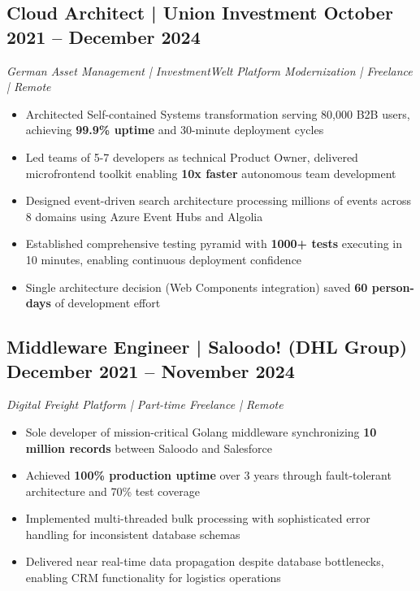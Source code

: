 \documentclass[10pt,a4paper]{article}
\begin{document}
\subsection*{Cloud Architect | Union Investment \hfill October 2021 -- December 2024}
\textit{German Asset Management | InvestmentWelt Platform Modernization | Freelance | Remote}
\begin{itemize}
\item Architected Self-contained Systems transformation serving 80,000 B2B users, achieving \textbf{99.9\% uptime} and 30-minute deployment cycles
\item Led teams of 5-7 developers as technical Product Owner, delivered microfrontend toolkit enabling \textbf{10x faster} autonomous team development
\item Designed event-driven search architecture processing millions of events across 8 domains using Azure Event Hubs and Algolia
\item Established comprehensive testing pyramid with \textbf{1000+ tests} executing in 10 minutes, enabling continuous deployment confidence
\item Single architecture decision (Web Components integration) saved \textbf{60 person-days} of development effort
\end{itemize}

\subsection*{Middleware Engineer | Saloodo! (DHL Group) \hfill December 2021 -- November 2024}
\textit{Digital Freight Platform | Part-time Freelance | Remote}
\begin{itemize}
\item Sole developer of mission-critical Golang middleware synchronizing \textbf{10 million records} between Saloodo and Salesforce
\item Achieved \textbf{100\% production uptime} over 3 years through fault-tolerant architecture and 70\% test coverage
\item Implemented multi-threaded bulk processing with sophisticated error handling for inconsistent database schemas
\item Delivered near real-time data propagation despite database bottlenecks, enabling CRM functionality for logistics operations
\end{itemize}
\end{document}
